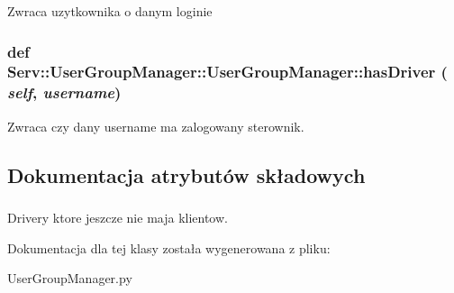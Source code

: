 \label{class_serv_1_1_user_group_manager_1_1_user_group_manager_aed20d08470748f78a641e6cc5700b505}
\begin{DoxyVerb}Zwraca uzytkownika o danym loginie\end{DoxyVerb}
 \hypertarget{class_serv_1_1_user_group_manager_1_1_user_group_manager_a39ae7245da0bcda25ce712d1b55f2f29}{
\subsubsection[{hasDriver}]{\setlength{\rightskip}{0pt plus 5cm}def Serv::UserGroupManager::UserGroupManager::hasDriver ( {\em self}, \/   {\em username})}}
\label{class_serv_1_1_user_group_manager_1_1_user_group_manager_a39ae7245da0bcda25ce712d1b55f2f29}
\begin{DoxyVerb}Zwraca czy dany username ma zalogowany sterownik.\end{DoxyVerb}
 

\subsection{Dokumentacja atrybutów składowych}
\hypertarget{class_serv_1_1_user_group_manager_1_1_user_group_manager_a00aa453d586337ce2692166c666a1817}{
\subsubsection[{drivers}]{}}
\label{class_serv_1_1_user_group_manager_1_1_user_group_manager_a00aa453d586337ce2692166c666a1817}


Drivery ktore jeszcze nie maja klientow. 



Dokumentacja dla tej klasy została wygenerowana z pliku:\begin{DoxyCompactItemize}
\item 
UserGroupManager.py\end{DoxyCompactItemize}
